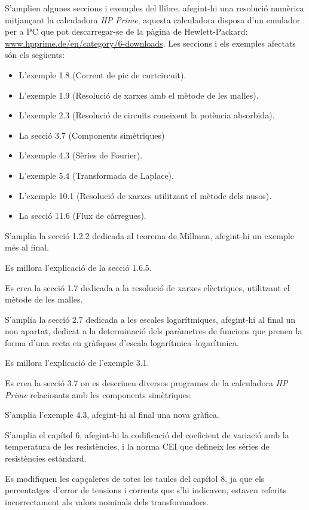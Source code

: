 S'amplien algunes seccions i exemples del llibre, afegint-hi una  resolució numèrica mitjançant la calculadora \emph{HP Prime};  aquesta calculadora disposa d'un emulador per a PC que pot descarregar-se de la pàgina de Hewlett-Packard: \href{http://www.hpprime.de/en/category/6-downloads}{www.hpprime.de/en/category/6-downloads}. Les seccions i els exemples afectats són els següents:
\begin{itemize}
  \item L'exemple 1.8  (Corrent de pic de curtcircuit).
  \item L'exemple 1.9 (Resolució de xarxes amb el mètode de les malles).
  \item L'exemple 2.3 (Resolució de circuits coneixent la potència absorbida).
  \item La secció 3.7 (Components simètriques)
  \item L'exemple 4.3 (Sèries de Fourier).
  \item L'exemple 5.4 (Transformada de Laplace).
  \item L'exemple 10.1 (Resolució de xarxes utilitzant el mètode dels nusos).
  \item La secció 11.6 (Flux de càrregues).
\end{itemize}

S'amplia la secció 1.2.2 dedicada al teorema de Millman, afegint-hi un exemple més al final.

Es millora l'explicació de la secció 1.6.5.

Es crea la secció 1.7 dedicada a la resolució de xarxes elèctriques, utilitzant el mètode de les malles.

S'amplia la secció 2.7 dedicada a les escales logarítmiques, afegint-hi al final un nou apartat, dedicat a la determinació dels paràmetres de funcions que prenen la forma d'una recta en gràfiques d'escala logarítmica--logarítmica.

Es millora l'explicació de l'exemple 3.1.

Es crea la secció 3.7 on es descriuen diversos programes de la calculadora
\emph{HP Prime} relacionats amb les components simètriques.

S'amplia l'exemple 4.3, afegint-hi al final  una nova gràfica.

S'amplia el capítol 6, afegint-hi la codificació del coeficient de variació amb la temperatura de les resistències, i la norma CEI que defineix les sèries de resistències estàndard.

Es modifiquen les capçaleres de totes les taules del capítol 8, ja que els percentatges d'error de tensions i corrents que s'hi indicaven, estaven referits incorrectament als valors nominals dels transformadors.


